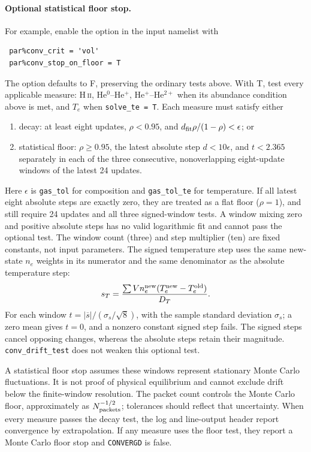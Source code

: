\documentclass[english,a4paper]{my_memo}
\newcommand{\code}[1]{\texttt{#1}}
\begin{document}
\paragraph{Optional statistical floor stop.}
For example, enable the option in the input namelist with
\begin{verbatim}
 par%conv_crit = 'vol'
 par%conv_stop_on_floor = T
\end{verbatim}
The option defaults to F, preserving the ordinary tests above.  With T,
test every applicable measure: H\,\textsc{ii}, He$^0$--He$^+$,
He$^+$--He$^{2+}$ when its abundance condition above is met, and $T_e$
when \code{solve\_te = T}.  Each measure must satisfy either
\begin{enumerate}\itemsep2pt
\item decay: at least eight updates, $\rho < 0.95$, and
  $d_{\rm fit}\rho/(1-\rho) < \epsilon$; or
\item statistical floor: $\rho \ge 0.95$, the latest absolute step
  $d < 10\epsilon$, and $t < 2.365$ separately in each of the three
  consecutive, nonoverlapping eight-update windows of the latest
  24 updates.
\end{enumerate}
Here $\epsilon$ is \code{gas\_tol} for composition and
\code{gas\_tol\_te} for temperature.  If all latest eight absolute steps are exactly zero, they are treated
as a flat floor ($\rho=1$), and still require 24 updates and all three
signed-window tests.  A window mixing zero and positive absolute steps
has no valid logarithmic fit and cannot pass the optional test.  The window count (three) and step multiplier
(ten) are fixed constants, not input parameters.
The signed temperature step uses the same new-state $n_e$ weights in its numerator and the same
denominator as the absolute temperature step:
\[
 s_T = \frac{\sum V n_e^{\rm new}(T_e^{\rm new}-T_e^{\rm old})}{D_T}.
\]
For each window $t=|\overline{s}|/(\sigma_s/\sqrt{8})$, with the
sample standard deviation $\sigma_s$; a zero mean gives $t=0$, and a
nonzero constant signed step fails.  The signed steps cancel opposing
changes, whereas the absolute steps retain their magnitude.
\code{conv\_drift\_test} does not weaken this optional test.

A statistical floor stop assumes these windows represent stationary
Monte Carlo fluctuations.  It is not proof of physical equilibrium and
cannot exclude drift below the finite-window resolution.  The packet
count controls the Monte Carlo floor, approximately as
$N_{\rm packets}^{-1/2}$; tolerances should reflect that uncertainty.
When every measure passes the decay test, the log and line-output
header report convergence by extrapolation.  If any measure uses the
floor test, they report a Monte Carlo floor stop and \code{CONVERGD}
is false.
\end{document}
